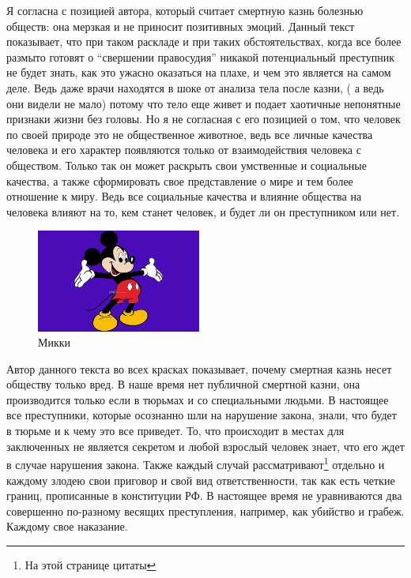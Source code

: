 \documentclass{report}
\begin{document}
Я согласна с позицией автора, который считает смертную казнь болезнью обществ: она мерзкая и не приносит позитивных эмоций. Данный текст показывает, что при таком раскладе и при таких обстоятельствах, когда все более размыто готовят о “свершении правосудия” никакой потенциальный преступник не будет знать, как это ужасно оказаться на плахе, и чем это является на самом деле. Ведь даже врачи находятся в шоке от анализа тела после казни, ( а ведь они видели не мало) потому что тело еще живет и подает хаотичные непонятные признаки жизни без головы. Но я не согласная с его позицией о том, что человек по своей природе это не общественное животное, ведь все личные качества человека и его характер появляются только от взаимодействия человека с обществом. Только так он может раскрыть свои умственные и социальные качества, а также сформировать свое представление о мире и тем более отношение к миру. Ведь все социальные качества и влияние общества на человека влияют на то, кем станет человек, и будет ли он преступником или нет.     

\begin{figure}
  \vspace{-20pt}
  \begin{center}
    \includegraphics[width=0.48\textwidth]{mickey_mouse.jpeg}
  \end{center}
  \vspace{-20pt}
  \caption{Микки} 
  \vspace{-10pt}
\end{figure}

Автор\cite{cederstrom2012dead} данного текста во всех красках показывает, почему смертная казнь несет обществу только вред. В наше время нет публичной смертной казни, она производится только если в тюрьмах и со специальными людьми. В настоящее все преступники, которые осознанно шли на нарушение закона, знали, что будет в тюрьме и к чему это все приведет\cite{holt1972some}. То, что происходит в местах для заключенных не является секретом и любой взрослый человек знает, что его ждет в случае нарушения закона. Также каждый случай рассматривают\footnote{На этой странице цитаты} отдельно\cite{lassauce2011deadwood} и каждому злодею свои приговор и свой вид ответственности, так как есть четкие границ\cite{bronfen2017over}, прописанные в    конституции РФ. В настоящее время не уравниваются два совершенно по-разному весящих преступления, например, как убийство и грабеж. Каждому свое наказание\cite{normey2007control}.
\end{document}
